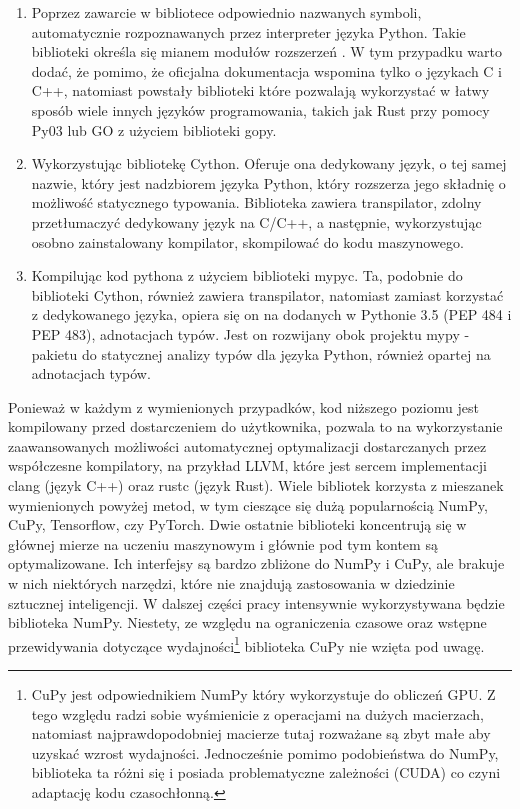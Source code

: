 \documentclass[11pt, a4paper]{article}
\begin{document}
\begin{sloppypar}
\begin{enumerate}
      \item Poprzez zawarcie w bibliotece odpowiednio nazwanych symboli, automatycznie
        rozpoznawanych przez interpreter języka Python. Takie biblioteki określa się mianem
        modułów rozszerzeń \cite{Extending_Python_With_C_Cpp}. W tym przypadku warto
        dodać, że pomimo, że oficjalna dokumentacja wspomina tylko o językach C i C++, natomiast
        powstały biblioteki które pozwalają wykorzystać w łatwy sposób wiele innych języków
        programowania, takich jak Rust przy pomocy Py03\cite{PyO3} lub GO z użyciem biblioteki
        gopy\cite{gopy}.

      \item Wykorzystując bibliotekę Cython\cite{Cython_Org}\cite{Cython_The_Best_Of_Both}.
        Oferuje ona dedykowany język, o tej samej nazwie, który jest nadzbiorem języka
        Python, który rozszerza jego składnię o możliwość statycznego typowania.
        Biblioteka zawiera transpilator, zdolny przetłumaczyć dedykowany język na C/C++,
        a następnie, wykorzystując osobno zainstalowany kompilator, skompilować do kodu
        maszynowego.

      \item Kompilując kod pythona z użyciem biblioteki mypyc\cite{mypyc}. Ta, podobnie
        do biblioteki Cython, również zawiera transpilator, natomiast zamiast korzystać
        z dedykowanego języka, opiera się on na dodanych w Pythonie 3.5\cite{Python_3_5}
        (PEP 484\cite{PEP_484} i PEP 483\cite{PEP_483}), adnotacjach typów. Jest on
        rozwijany obok projektu mypy - pakietu do statycznej analizy typów dla języka
        Python, również opartej na adnotacjach typów\cite{mypy}.
    \end{enumerate}

    Ponieważ w każdym z wymienionych przypadków, kod niższego poziomu jest kompilowany
    przed dostarczeniem do użytkownika, pozwala to na wykorzystanie zaawansowanych możliwości
    automatycznej optymalizacji dostarczanych przez współczesne kompilatory, na przykład
    LLVM, które jest sercem implementacji clang (język C++) oraz rustc (język Rust).
    Wiele bibliotek korzysta z mieszanek wymienionych powyżej metod, w tym cieszące się dużą
    popularnością NumPy, CuPy, Tensorflow, czy PyTorch. Dwie ostatnie biblioteki koncentrują
    się w głównej mierze na uczeniu maszynowym i głównie pod tym kontem są optymalizowane.
    Ich interfejsy są bardzo zbliżone do NumPy i CuPy, ale brakuje w nich niektórych narzędzi,
    które nie znajdują zastosowania w dziedzinie sztucznej inteligencji. W dalszej części
    pracy intensywnie wykorzystywana będzie biblioteka NumPy. Niestety, ze względu na ograniczenia
    czasowe oraz wstępne przewidywania dotyczące wydajności\footnote{CuPy jest
    odpowiednikiem NumPy który wykorzystuje do obliczeń GPU. Z tego względu radzi sobie wyśmienicie
    z operacjami na dużych macierzach, natomiast najprawdopodobniej macierze tutaj
    rozważane są zbyt małe aby uzyskać wzrost wydajności\cite{CPU_VS_GPU}. Jednocześnie
    pomimo podobieństwa do NumPy, biblioteka ta różni się i posiada problematyczne zależności
    (CUDA) co czyni adaptację kodu czasochłonną.} biblioteka CuPy nie wzięta pod uwagę.


\end{sloppypar}
\end{document}
